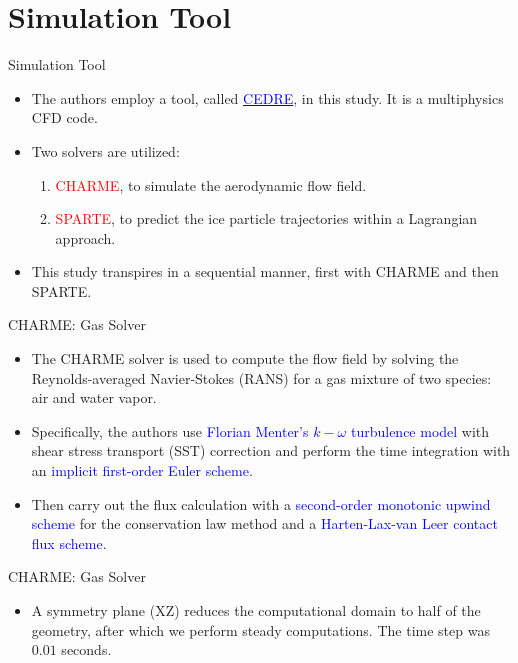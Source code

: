 \documentclass[aspectratio=169,xcolor=dvipsnames]{beamer}
\begin{document}
\section{Simulation Tool}

\begin{frame}{Simulation Tool}
    \begin{itemize}
        \item The authors employ a tool, called \href{https://aerospacelab.onera.fr/CEDRE-Software}{\textcolor{blue}{CEDRE}}, in this study. It is a multiphysics CFD code. 
        \item Two solvers are utilized:
        \begin{enumerate}
            \item \textcolor{red}{CHARME}, to simulate the aerodynamic flow field.
            \item \textcolor{red}{SPARTE}, to predict the ice particle trajectories within a Lagrangian approach. 
        \end{enumerate}
        \item This study transpires in a sequential manner, first with CHARME and then SPARTE. 
    \end{itemize}
\end{frame}


\begin{frame}{CHARME: Gas Solver}
    \begin{itemize}
        \item The CHARME solver is used to compute the flow field by solving the Reynolds-averaged Navier-Stokes (RANS) for a gas mixture of two species: air and water vapor. 
        \item Specifically, the authors use \textcolor{blue}{Florian Menter's $k-\omega$ turbulence model} with shear stress transport (SST) correction and perform the time integration with an \textcolor{blue}{implicit first-order Euler scheme}. 
        \item Then carry out the flux calculation with a \textcolor{blue}{second-order monotonic upwind scheme} for the conservation law method and a \textcolor{blue}{Harten-Lax-van Leer contact flux scheme}. 
    \end{itemize}
\end{frame}

\begin{frame}{CHARME: Gas Solver}
    \begin{itemize}
        \item A symmetry plane (XZ) reduces the computational domain to half of the geometry, after which we perform steady computations. The time step was $0.01$ seconds.
    \end{itemize}
\end{frame}
\end{document}
